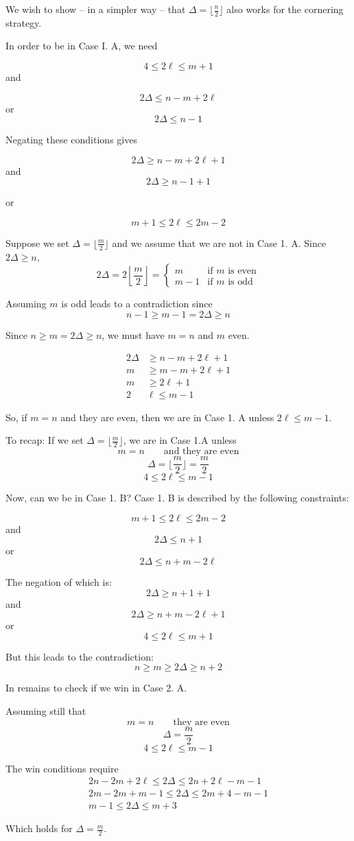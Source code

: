 We wish to show -- in a simpler way -- that $\Delta = \lfloor \frac{n}{2} \rfloor$
also works for the cornering strategy.

In order to be in Case I. A, we need

\[ 4 \leq 2 \ell \leq m+1 \]
and

\[ 2\Delta \leq n - m + 2\ell \]
or
\[ 2\Delta \leq n-1 \]

Negating these conditions gives

\[ 2\Delta \geq n - m + 2\ell +1 \]
and
\[ 2 \Delta \geq n - 1 + 1 \]

or

\[ m+1 \leq 2 \ell \leq 2m -2 \]

Suppose we set $\Delta = \lfloor \frac{m}{2} \rfloor$ and we assume that
we are not in Case 1. A. Since $2\Delta \geq n$,
\[
2\Delta = 2 \left\lfloor \frac{m}{2} \right\rfloor =
\begin{cases}
m & \text{if $m$ is even} \\
m -1 & \text{if $m$ is odd}
\end{cases}
\]

Assuming $m$ is odd leads to a contradiction since
\[ n-1 \geq m-1 = 2\Delta \geq n \]

Since $n \geq m = 2 \Delta \geq n$, we must have $m = n$ and $m$ even.

\begin{align*}
  2 \Delta & \geq n - m + 2\ell + 1 \\
  m & \geq m - m + 2 \ell + 1 \\
  m & \geq 2 \ell + 1 \\
  2 & \ell \leq m -1
\end{align*}

So, if $m = n$ and they are even, then we are in Case 1. A unless $2 \ell \leq m -1$.

To recap: If we set $\Delta = \lfloor \frac{m}{2} \rfloor$, we are in Case 1.A unless
\[ m = n \qquad \text{and they are even} \]
\[ \Delta = \lfloor \frac{m}{2} \rfloor = \frac{m}{2} \]
\[ 4 \leq 2 \ell \leq m -1 \]

Now, can we be in Case 1. B? Case 1. B is described by the following constraints:

\[ m+1 \leq 2 \ell \leq 2m -2 \]
and
\[2 \Delta \leq n +1 \]
or
\[2\Delta \leq n + m - 2 \ell \]

The negation of which is:
\[2 \Delta \geq n +1 +1 \]
and
\[2\Delta \geq n + m - 2 \ell + 1\]
or
\[4 \leq 2 \ell \leq m +1 \]

But this leads to the contradiction:
\[ n \geq m \geq 2 \Delta \geq n +2 \]

In remains to check if we win in Case 2. A.

Assuming still that
\[ m = n \qquad \text{they are even} \]
\[ \Delta = \frac{m}{2} \]
\[ 4 \leq 2 \ell \leq m -1 \]

The win conditions require
\begin{align*}
2n - 2m + 2\ell \leq 2 \Delta \leq 2n + 2\ell -m -1 \\
2m - 2m + m - 1 \leq 2 \Delta \leq 2m + 4 - m - 1 \\
m - 1 \leq 2 \Delta \leq m + 3
\end{align*}

Which holds for $\Delta = \frac{m}{2}$.
